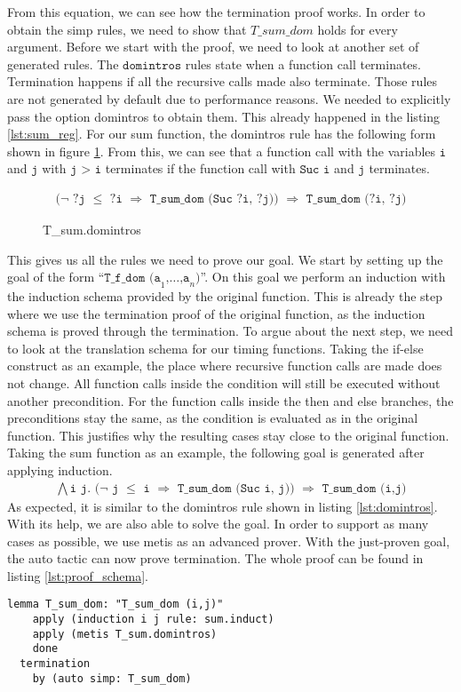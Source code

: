 From this equation, we can see how the termination proof works.
In order to obtain the simp rules, we need to show that $T\_sum\_dom$ holds for every argument.
Before we start with the proof, we need to look at another set of generated rules.
The $\texttt{domintros}$ rules state when a function call terminates.
Termination happens if all the recursive calls made also terminate.
Those rules are not generated by default due to performance reasons.
We needed to explicitly pass the option domintros to obtain them.
This already happened in the listing \ref{lst:sum_reg}.
For our sum function, the domintros rule has the following form shown in figure \ref{fig:domintros}.
From this, we can see that a function call with the variables $\texttt{i}$ and $\texttt{j}$ with $\texttt{j > i}$ terminates
if the function call with $\texttt{Suc i}$ and $\texttt{j}$ terminates.
\begin{figure}[H]
\begin{align*}
  \texttt{($\lnot$ ?j $\le$ ?i $\Longrightarrow$ T\_sum\_dom (Suc ?i, ?j)) $\Longrightarrow$ T\_sum\_dom (?i, ?j)}
\end{align*}
\caption{T\_sum.domintros}
\label{fig:domintros}
\end{figure}

This gives us all the rules we need to prove our goal.
We start by setting up the goal of the form ``$\texttt{T\_f\_dom (a}_{1}\texttt{,}\dots\texttt{,a}_{n}\texttt{)}$''.
On this goal we perform an induction with the induction schema provided by the original function.
This is already the step where we use the termination proof of the original function,
as the induction schema is proved through the termination.
To argue about the next step, we need to look at the translation schema for our timing functions.
Taking the if-else construct as an example, the place where recursive function calls are made does not change.
All function calls inside the condition will still be executed without another precondition.
For the function calls inside the then and else branches, the preconditions stay the same, as the condition is evaluated as in the original function.
This justifies why the resulting cases stay close to the original function.
Taking the sum function as an example, the following goal is generated after applying induction.
\begin{align*}
  \texttt{$\bigwedge$i j. ($\lnot$ j $\le$ i $\Longrightarrow$ T\_sum\_dom (Suc i, j)) $\Longrightarrow$ T\_sum\_dom (i,j)}
\end{align*}
As expected, it is similar to the domintros rule shown in listing \ref{lst:domintros}.
With its help, we are also able to solve the goal.
In order to support as many cases as possible, we use metis as an advanced prover.
With the just-proven goal, the auto tactic can now prove termination.
The whole proof can be found in listing \ref{lst:proof_schema}.
\begin{lstlisting}[language=isabelle,mathescape=true,label=lst:proof_schema,caption=Proof schema over dom with help of original function]
  lemma T_sum_dom: "T_sum_dom (i,j)"
    apply (induction i j rule: sum.induct)
    apply (metis T_sum.domintros)
    done
  termination
    by (auto simp: T_sum_dom)
\end{lstlisting}


